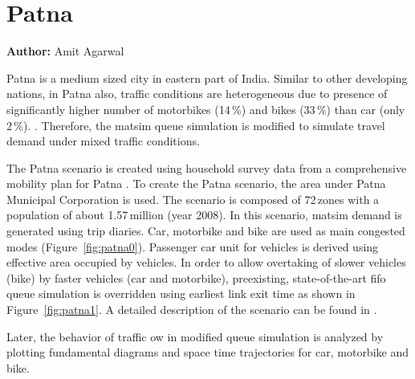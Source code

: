\section{Patna}
\label{sec:patna}
\hfill \textbf{Author:} Amit Agarwal

Patna is a medium sized city in eastern part of India. Similar to other developing nations, in Patna also, traffic conditions are heterogeneous due to presence of significantly higher number of motorbikes (14\,\%) and bikes (33\,\%) than car (only 2\,\%). . Therefore, the \gls{matsim} queue simulation is modified to simulate travel demand under mixed traffic conditions.


The Patna scenario is created using household survey data from a comprehensive mobility plan for Patna \citep[][]{TrippItransVks2009PatnaReport}. To create the Patna scenario, the area under Patna Municipal Corporation is used. The scenario is composed of 72\,zones with a population of about 1.57\,million (year 2008). In this scenario, \gls{matsim} demand is generated using trip diaries. Car, motorbike and bike are used as main congested modes (Figure~\ref{fig:patna0}). Passenger car unit for vehicles is derived using effective area occupied by vehicles. In order to allow overtaking of slower vehicles (bike) by faster vehicles (car and motorbike), preexisting, state-of-the-art \gls{fifo} queue simulation is overridden using earliest link exit time as shown in Figure~\ref{fig:patna1}. A detailed description of the scenario can be found in \citet[][]{AgarwalEtcMixedTraffic}.

Later, the behavior of traffic ow in modified queue simulation is analyzed by plotting fundamental diagrams and space time trajectories for car, motorbike and bike.

